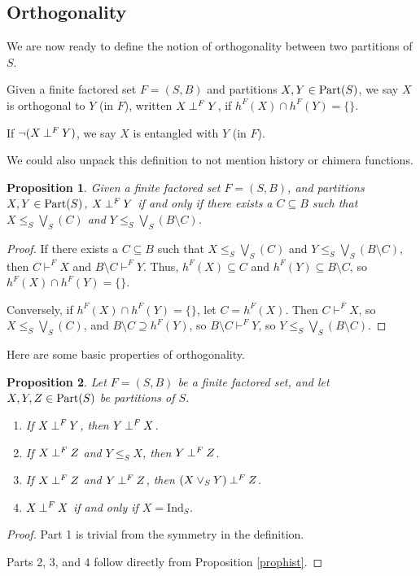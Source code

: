 \documentclass[authordate,onecolumn]{miri-tech-article}
\newtheorem{proposition}{Proposition}
\begin{document}
\subsection{Orthogonality}
We are now ready to define the notion of orthogonality between two partitions of $S$.
\begin{definition}[orthogonality]
Given a finite factored set $F=(S,B)$ and partitions $X,Y\in \text{Part}(S)$, we say $X$ is orthogonal to $Y$ (in $F$), written $X\mathbin{\perp^{F}}Y$, if $h^F(X)\cap h^F(Y)=\{\}$.

If $\neg(X\mathbin{\perp^{F}}Y)$, we say $X$ is entangled with $Y$ (in $F$).
\end{definition}
We could also unpack this definition to not mention history or chimera functions. 
\begin{proposition}
Given a finite factored set $F=(S,B)$, and partitions $X,Y\in \text{Part}(S)$,  $X\mathbin{\perp^{F}}Y$ if and only if there exists a $C\subseteq B$ such that $X\leq_S\bigvee_S(C)$ and $Y\leq_S\bigvee_S(B\setminus C)$.
\end{proposition}
\begin{proof}
If there exists a $C\subseteq B$ such that $X\leq_S\bigvee_S(C)$ and $Y\leq_S\bigvee_S(B\setminus C)$, then $C\vdash^F X$ and $B\setminus C\vdash^F Y$. Thus, $h^F(X)\subseteq C$ and $h^F(Y)\subseteq B\setminus C$, so $h^F(X)\cap h^F(Y)=\{\}$.

Conversely, if $h^F(X)\cap h^F(Y)=\{\}$, let $C=h^F(X)$. Then $C\vdash^F X$, so $X\leq_S\bigvee_S(C)$, and $B\setminus C\supseteq h^F(Y)$, so $B\setminus C\vdash^F Y$, so $Y\leq_S\bigvee_S(B\setminus C)$.
\end{proof}
Here are some basic properties of orthogonality.
\begin{proposition}
Let $F=(S,B)$ be a finite factored set, and let $X,Y,Z\in \text{Part}(S)$ be partitions of $S$.
\begin{enumerate}
    \item If $X\mathbin{\perp^{F}}Y$, then $Y\mathbin{\perp^{F}}X$.
    \item If $X\mathbin{\perp^{F}}Z$ and $Y\leq_S X$, then $Y\mathbin{\perp^{F}}Z$.
    \item If $X\mathbin{\perp^{F}}Z$ and $Y\mathbin{\perp^{F}}Z$, then $(X\vee_S Y)\mathbin{\perp^{F}}Z$.
        \item $X\mathbin{\perp^{F}}X$ if and only if $X=\text{Ind}_S$.
\end{enumerate}
\end{proposition}
\begin{proof}
Part 1 is trivial from the symmetry in the definition. 

Parts 2, 3, and 4 follow directly from Proposition \ref{prophist}.
\end{proof}
\end{document}
